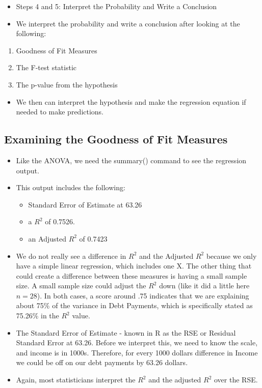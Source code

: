 \documentclass[
  letterpaper,
  DIV=11,
  numbers=noendperiod]{scrreprt}
\providecommand{\tightlist}{%
  \setlength{\itemsep}{0pt}\setlength{\parskip}{0pt}}\usepackage{longtable,booktabs,array}
\begin{document}
\begin{itemize}
\tightlist
\item
  Steps 4 and 5: Interpret the Probability and Write a Conclusion
\item
  We interpret the probability and write a conclusion after looking at
  the following:
\end{itemize}

\begin{enumerate}
\def\labelenumi{\arabic{enumi}.}
\tightlist
\item
  Goodness of Fit Measures
\item
  The F-test statistic
\item
  The p-value from the hypothesis
\end{enumerate}

\begin{itemize}
\tightlist
\item
  We then can interpret the hypothesis and make the regression equation
  if needed to make predictions.
\end{itemize}

\subsection{Examining the Goodness of Fit
Measures}\label{examining-the-goodness-of-fit-measures}

\begin{itemize}
\item
  Like the ANOVA, we need the summary() command to see the regression
  output.
\item
  This output includes the following:

  \begin{itemize}
  \tightlist
  \item
    Standard Error of Estimate at 63.26
  \item
    a \(R^2\) of 0.7526.
  \item
    an Adjusted \(R^2\) of 0.7423
  \end{itemize}
\item
  We do not really see a difference in \(R^2\) and the Adjusted \(R^2\)
  because we only have a simple linear regression, which includes one X.
  The other thing that could create a difference between these measures
  is having a small sample size. A small sample size could adjust the
  \(R^2\) down (like it did a little here \(n=28\)). In both cases, a
  score around .75 indicates that we are explaining about 75\% of the
  variance in Debt Payments, which is specifically stated as 75.26\% in
  the \(R^2\) value.
\item
  The Standard Error of Estimate - known in R as the RSE or Residual
  Standard Error at 63.26. Before we interpret this, we need to know the
  scale, and income is in 1000s. Therefore, for every 1000 dollars
  difference in Income we could be off on our debt payments by 63.26
  dollars.
\item
  Again, most statisticians interpret the \(R^2\) and the adjusted
  \(R^2\) over the RSE.
\end{itemize}
\end{document}
